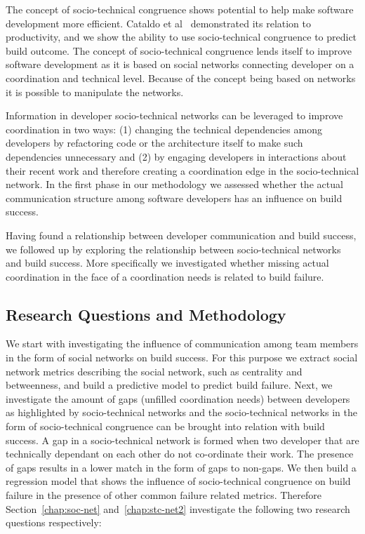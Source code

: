 The concept of socio-technical congruence shows potential to help make software development more efficient.
Cataldo et al~\cite{cataldo:cscw:2006} demonstrated its relation to productivity, and we show the ability to use socio-technical congruence to predict build outcome.
The concept of socio-technical congruence lends itself to improve software development as it is based on social networks connecting developer on a coordination and technical level.
Because of the concept being based on networks it is possible to manipulate the networks.

Information in developer socio-technical networks can be leveraged to improve coordination in two ways: (1) changing the technical dependencies among developers by refactoring code or the architecture itself  to make such dependencies unnecessary and (2) by engaging developers in interactions about their recent work and therefore creating a coordination edge in the socio-technical network.
In the first phase in our methodology we assessed whether the actual communication structure among software developers has an influence on build success. 

Having found a relationship between developer communication and build success, we followed up by exploring the relationship between socio-technical networks and build success. More specifically we investigated whether missing actual coordination in the face of a coordination needs is related to build failure.


\subsection{Research Questions and Methodology}
We start with investigating the influence of communication among team members in the form of social networks on build success.
%
%
For this purpose we extract social network metrics describing the social network, such as centrality and betweenness,  and build a predictive model to predict build failure.
%
%
Next, we investigate the amount of gaps (unfilled coordination needs) between developers as highlighted by socio-technical networks and the socio-technical networks in the form of socio-technical congruence can be brought into relation with build success.
%
%
A gap in a socio-technical network is formed when two developer that are technically dependant on each other do not co-ordinate their work.
The presence of gaps results in a lower match in the form of gaps to non-gaps.
We then build a regression model that shows the influence of socio-technical congruence on build failure in the presence of other common failure related metrics.
%
%
Therefore Section~\ref{chap:soc-net} and~\ref{chap:stc-net2} investigate the following two research questions respectively:

